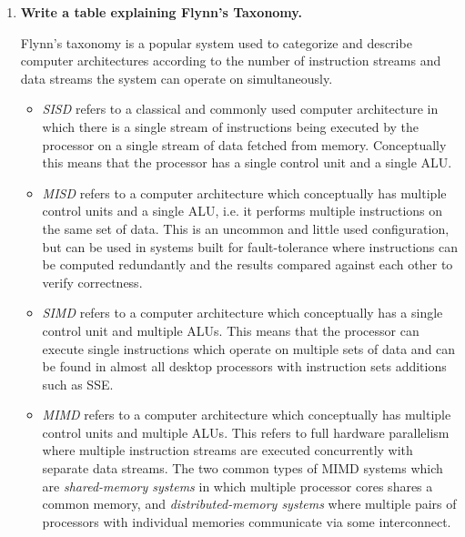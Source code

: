 \begin{enumerate}

\item \textbf{Write a table explaining Flynn's Taxonomy.}

Flynn's taxonomy is a popular system used to categorize and describe computer architectures according to the number of instruction streams and data streams the system can operate on simultaneously.

\begin{itemize}

\item \textit{\acf {SISD}} refers to a classical and commonly used computer architecture in which there is a single stream of instructions being executed by the processor on a single stream of data fetched from memory. Conceptually this means that the processor has a single control unit and a single \ac{ALU}.

\item \textit{\acf{MISD}} refers to a computer architecture which conceptually has multiple control units and a single \ac{ALU}, i.e. it performs multiple instructions on the same set of data. This is an uncommon and little used configuration, but can be used in systems built for fault-tolerance where instructions can be computed redundantly and the results compared against each other to verify correctness. \\

\item \textit{\acf{SIMD}} refers to a computer architecture which conceptually has a single control unit and multiple \acp{ALU}. This means that the processor can execute single instructions which operate on multiple sets of data and can be found in almost all desktop processors with instruction sets additions such as \ac{SSE}.

\item \textit{\acf{MIMD}} refers to a computer architecture which conceptually has multiple control units and multiple \acp{ALU}. This refers to full hardware parallelism where multiple instruction streams are executed concurrently with separate data streams. The two common types of \ac{MIMD} systems which are \textit{shared-memory systems} in which multiple processor cores shares a common memory, and \textit{distributed-memory systems} where multiple pairs of processors with individual memories communicate via some interconnect.

\end{itemize}


\end{enumerate}
